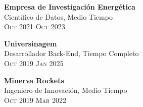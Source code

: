 \documentclass[oneside]{article}
\begin{document}
{\begin{minipage}[t][\dimexpr\textheight-2\fboxrule-2\fboxsep\relax][t]{\dimexpr0.6\textwidth-2\fboxrule-2\fboxsep\relax}
        {\large \textbf{Empresa de Investigación Energética}} \\ 
        {{\selectfont Científico de Datos, Medio Tiempo}} \\ 
        {\scshape{}\selectfont\footnotesize Oct 2021 \textendash{} Oct 2023} 
        \vspace{.3cm}

        {\large \textbf{Universinagem}}\\
        {{\selectfont Desarrollador Back-End, Tiempo Completo}}\\
        {\scshape{}\selectfont\footnotesize Oct 2019 \textendash{} Jan 2025} 
        \vspace{.3cm}

        {\large \textbf{Minerva Rockets}}\\
        {{\selectfont Ingeniero de Innovación, Medio Tiempo}}\\
        {\scshape{}\selectfont\footnotesize Oct 2019 \textendash{} Mar 2022} 
        \vspace{.3cm}

\end{minipage}}
\end{document}
